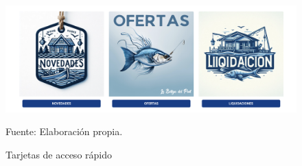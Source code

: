 \begin{figure}[H]
\begin{center}
\includegraphics[scale=0.4]{./Images/vistaCards.png}
\caption{Tarjetas de acceso rápido} Fuente: Elaboración propia.

\label{fig:fig1}

\end{center}
\end{figure}


